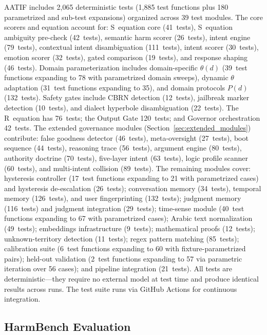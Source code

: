 \documentclass[11pt,a4paper]{article}
\begin{document}
AATIF includes 2{,}065 deterministic tests (1{,}885 test functions plus 180 parametrized and sub-test expansions) organized across 39 test modules. The core scorers and equation account for: S~equation core (41~tests), S~equation ambiguity pre-check (42~tests), semantic harm scorer (26~tests), intent engine (79~tests), contextual intent disambiguation (111~tests), intent scorer (30~tests), emotion scorer (32~tests), gated comparison (19~tests), and response shaping (46~tests). Domain parameterization includes domain-specific $\theta(d)$ (39~test functions expanding to 78 with parametrized domain sweeps), dynamic $\theta$ adaptation (31~test functions expanding to 35), and domain protocols $P(d)$ (132~tests). Safety gates include CBRN detection (12~tests), jailbreak marker detection (10~tests), and dialect hyperbole disambiguation (22~tests). The R~equation has 76~tests; the Output Gate 120~tests; and Governor orchestration 42~tests. The extended governance modules (Section~\ref{sec:extended_modules}) contribute: false goodness detector (46~tests), meta-oversight (27~tests), boot sequence (44~tests), reasoning trace (56~tests), argument engine (80~tests), authority doctrine (70~tests), five-layer intent (63~tests), logic profile scanner (60~tests), and multi-intent collision (89~tests). The remaining modules cover: hysteresis controller (17~test functions expanding to 21 with parametrized cases) and hysteresis de-escalation (26~tests); conversation memory (34~tests), temporal memory (126~tests), and user fingerprinting (132~tests); judgment memory (116~tests) and judgment integration (29~tests); time-sense module (40~test functions expanding to 67 with parametrized cases); Arabic text normalization (49~tests); embeddings infrastructure (9~tests); mathematical proofs (12~tests); unknown-territory detection (11~tests); regex pattern matching (85~tests); calibration suite (6~test functions expanding to 60 with fixture-parametrized pairs); held-out validation (2~test functions expanding to 57 via parametric iteration over 56 cases); and pipeline integration (21~tests). All tests are deterministic---they require no external model at test time and produce identical results across runs. The test suite runs via GitHub Actions for continuous integration.


\subsection{HarmBench Evaluation}
\end{document}
